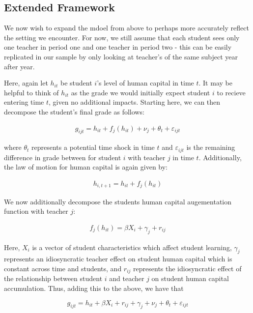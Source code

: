 \documentclass{article}
\begin{document}
\subsection{Extended Framework}  

We now wish to expand the mdoel from above to perhaps more accurately reflect the setting we encounter. For now, we still assume that each student sees only one teacher in period one and one teacher in period two - this can be easily replicated in our sample by only looking at teacher's of the same subject year after year. 

Here, again let $h_{it}$ be student $i$'s level of human capital in time $t$. It may be helpful to think of $h_{it}$ as the grade we would initially expect student $i$ to recieve entering time $t$, given no additional impacts. Starting here, we can then decompose the student's final grade as follows: 

\begin{align}
	g_{ijt} = h_{it} + f_j(h_{it}) + \nu_{j} + \theta_{t} + \varepsilon_{ijt}
\end{align}

where $\theta_t$ represents a potential time shock in time $t$ and $\varepsilon_{ijt}$ is the remaining difference in grade between for student $i$ with teacher $j$ in time $t$. Additionally, the law of motion for human capital is again given by:

\begin{align}
	h_{i, t+1} = h_{it} + f_j(h_{it})
\end{align}

We now additionally decompose the students human capital augementation function with teacher $j$:

\begin{align}
	f_j(h_{it}) = \beta X_{i} + \gamma_{j} + r_{ij} 
\end{align}

Here, $X_{i}$ is a vector of student characteristics which affect student learning, $\gamma_j$ represents an idiosyncratic teacher effect on student human capital which is constant across time and students, and $r_{ij}$ represents the idiosyncratic effect of the relationship between student $i$ and teacher $j$ on student human capital accumulation. Thus, adding this to the above, we have that 

\begin{equation}
	g_{ijt} =  h_{it} + \beta X_{i} + r_{ij} + \gamma_{j} + \nu_{j} + \theta_{t} + \varepsilon_{ijt} 
\end{equation}
\end{document}
